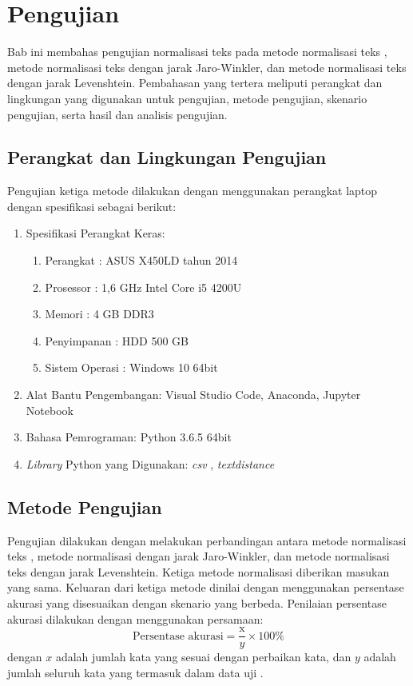 \chapter{Pengujian}

Bab ini membahas pengujian normalisasi teks pada metode normalisasi teks \parencite{saragih2017normalisasi}, metode normalisasi teks dengan jarak Jaro-Winkler, dan metode normalisasi teks dengan jarak Levenshtein. Pembahasan yang tertera meliputi perangkat dan lingkungan yang digunakan untuk pengujian, metode pengujian, skenario pengujian, serta hasil dan analisis pengujian.

\section{Perangkat dan Lingkungan Pengujian}

Pengujian ketiga metode dilakukan dengan menggunakan perangkat laptop dengan spesifikasi sebagai berikut:
\begin{enumerate}
    \item Spesifikasi Perangkat Keras:
    \begin{enumerate}
        \setlength{\itemsep}{1pt}
        \item Perangkat \tab \tab : ASUS X450LD tahun 2014
        \item Prosessor \tab \tab : 1,6 GHz Intel Core i5 4200U
        \item Memori \tab \tab : 4 GB DDR3
        \item Penyimpanan \tab : HDD 500 GB
        \item Sistem Operasi \tab : Windows 10 64bit
    \end{enumerate}
    \item Alat Bantu Pengembangan: Visual Studio Code, Anaconda, Jupyter Notebook
    \item Bahasa Pemrograman: Python 3.6.5 64bit
    \item \textit{Library} Python yang Digunakan: \textit{csv} \parencite{pythoncsv}, \textit{textdistance} \parencite{orsiniumtext}
\end{enumerate}

\section{Metode Pengujian}

Pengujian dilakukan dengan melakukan perbandingan antara metode normalisasi teks \parencite{saragih2017normalisasi}, metode normalisasi dengan jarak Jaro-Winkler, dan metode normalisasi teks dengan jarak Levenshtein. Ketiga metode normalisasi diberikan masukan yang sama. Keluaran dari ketiga metode dinilai dengan menggunakan persentase akurasi yang disesuaikan dengan skenario yang berbeda. Penilaian persentase akurasi dilakukan dengan menggunakan persamaan:
\begin{equation*}
	\text{Persentase akurasi}=\frac{\text{x}}{y} \times 100\%
\end{equation*}
\noindent
dengan $x$ adalah jumlah kata yang sesuai dengan perbaikan kata, dan $y$ adalah jumlah seluruh kata yang termasuk dalam data uji \parencite{saragih2017normalisasi}.

